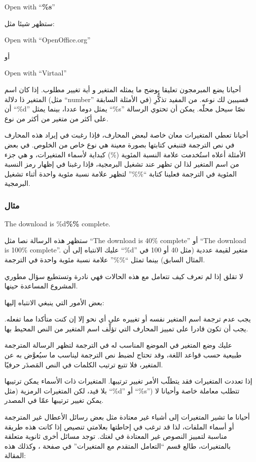 Open with “{\bf \%s}”

ستظهر شيئا مثل:

Open with “OpenOffice.org”

أو

Open with “Virtaal”

أحيانا يضع المبرمجون تعليقا يوضح ما يمثله المتغير و أية تغيير مطلوب. إذا
كان اسم المتغير ذا دلالة (مثل “number” في الأمثلة السابقة) فسيبين لك
نوعه. من المفيد تذكُّرِ أن “‪\%d‬” يمثل دوما عددا، بينما يمثل “‪\%s‬”
نصّا سيحل محلّه. يمكن أن تحتوي الرسالة على أكثر من متغير من أكثر من
نوع.

أحيانا تعطي المتغيرات معان خاصة لبعض المحارف، فإذا رغبت في إيراد هذه
المحارف في نص الترجمة فتنبغي كتابتها بصورة معينة هي نوع خاص من الخلوص.
في بعض الأمثلة أعلاه استُخدمت علامة النسبة المئوية (\%) كبداية لأسماء
المتغيرات، و هي جزء من اسم المتغير لذا لن تظهر عند تشغيل البرمجية، فإذا
رغبنا في إظهار رمز النسبة المئوية في الترجمة فعلينا كتابة “\%\%” لتظهر
علامة نسبة مئوية واحدة أثناء تشغيل البرمجية.

\subsubsection{مثال}
The download is \%d{\bf \%\%} complete.

ستظهر هذه الرسالة نصا مثل “The download is 40\% complete” أو “The
download is 100\% complete”. عليك الانتباه إلى أن ‪“\%d”‬ متغير لقيمة
عددية (مثل 40 أو 100 في المثال السابق) بينما تمثل “\%\%” علامة نسبة
مئوية واحدة في الترجمة.

لا تقلق إذا لم تعرف كيف تتعامل مع هذه الحالات فهي نادرة وتستطيع سؤال
مطوري المشروع المساعدة حينها.

بعض الأمور التي ينبغي الانتباه إليها:

\startitemize[1]
\item يجب عدم ترجمة اسم المتغير نفسه أو تغييره على أي نحو إلا إن كنت
متأكدا مما تفعله. يجب أن تكون قادرا على تمييز المحارف التي تؤلِّف اسم
المتغير من النص المحيط بها.
\item عليك وضع المتغير في الموضع المناسب له في الترجمة لتظهر الرسالة
المترجمة طبيعية حسب قواعد اللغة، وقد تحتاج لضبط نص الترجمة ليناسب ما
سيُعوَّض به عن المتغير، فلا تتبع ترتيب الكلمات في النص المَصدَر حرفيًا.
\item إذا تعددت المتغيرات فقد يتطلّب الأمر تغيير ترتيبها. المتغيرات ذات
الأسماء يمكن ترتيبها بلا قيد، لكن المتغيرات الرمزية (مثل “‪\%d‬” أو
“‪\%s‬”) تتطلب معاملة خاصة وأحيانا لا يمكن تغيير ترتيبها عمّا في
المصدر.
\item أحيانا ما تشير المتغيرات إلى أشياء غير معتادة مثل بعض رسائل
الأعطال غير المترجمة أو أسماء الملفات، لذا قد ترغب في إحاطتها بعلامتي
تنصيص إذا كانت هذه طريقة مناسبة لتمييز النصوص غير المعتادة في لغتك.
\stopitemize
توجد مسائل أخرى ثانوية متعلقة بالمتغيرات، طالع قسم “التعامل المتقدم مع
المتغيرات” في صفحة \at[ref:43252826]، وكذلك هذه المقالة:

